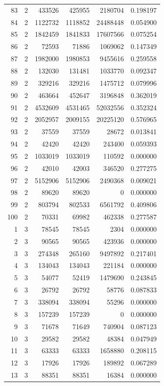 \begin{longtable}{rrrrrr}
83 & 2 & 433526 & 425955 & 2180704 & 0.198197\\
84 & 2 & 1122732 & 1118852 & 24488448 & 0.054900\\
85 & 2 & 1842459 & 1841833 & 17607566 & 0.075254\\
86 & 2 & 72593 & 71886 & 1069062 & 0.147349\\
87 & 2 & 1982000 & 1980853 & 9455616 & 0.259558\\
88 & 2 & 132030 & 131481 & 1033770 & 0.092347\\
89 & 2 & 329216 & 329216 & 1475712 & 0.079996\\
90 & 2 & 463664 & 452647 & 3196848 & 0.362019\\
91 & 2 & 4532609 & 4531465 & 52032556 & 0.352324\\
92 & 2 & 2052957 & 2009155 & 20225120 & 0.576965\\
93 & 2 & 37559 & 37559 & 28672 & 0.013841\\
94 & 2 & 42420 & 42420 & 243400 & 0.059393\\
95 & 2 & 1033019 & 1033019 & 110592 & 0.000000\\
96 & 2 & 42010 & 42003 & 346520 & 0.277275\\
97 & 2 & 5152906 & 5152906 & 2490368 & 0.009021\\
98 & 2 & 89620 & 89620 & 0 & 0.000000\\
99 & 2 & 803794 & 802533 & 6561792 & 0.409806\\
100 & 2 & 70331 & 69982 & 462338 & 0.277587\\
1 & 3 & 78545 & 78545 & 2304 & 0.000000\\
2 & 3 & 90565 & 90565 & 423936 & 0.000000\\
3 & 3 & 274348 & 265160 & 9497892 & 0.217401\\
4 & 3 & 134043 & 134043 & 221184 & 0.000000\\
5 & 3 & 54077 & 52419 & 1479690 & 0.243845\\
6 & 3 & 26792 & 26792 & 58776 & 0.087833\\
7 & 3 & 338094 & 338094 & 55296 & 0.000000\\
8 & 3 & 157239 & 157239 & 0 & 0.000000\\
9 & 3 & 71678 & 71649 & 740904 & 0.087123\\
10 & 3 & 29582 & 29582 & 48384 & 0.047949\\
11 & 3 & 63333 & 63333 & 1658880 & 0.208115\\
12 & 3 & 17926 & 17926 & 189892 & 0.067289\\
13 & 3 & 88351 & 88351 & 16384 & 0.000000\\

\end{longtable}
